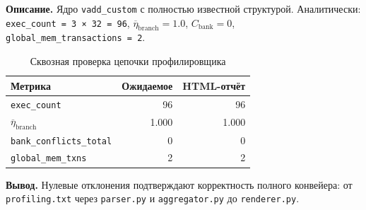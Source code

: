 \textbf{Описание.}
Ядро \texttt{vadd\_custom} с полностью известной структурой.
Аналитически: \texttt{exec\_count = 3~×~32 = 96},
$\overline{\eta}_{\mathrm{branch}} = 1.0$, $C_{\mathrm{bank}} = 0$,
\texttt{global\_mem\_transactions~= 2}.

\begin{table}[h]
  \caption{Сквозная проверка цепочки профилировщика}
  \label{tab:aggregation_test}
  \centering
  \begin{tabular}{lrr}
    \toprule
    \textbf{Метрика} & \textbf{Ожидаемое} & \textbf{HTML-отчёт} \\
    \midrule
    \texttt{exec\_count}          & 96    & 96    \\
    $\overline{\eta}_{\mathrm{branch}}$  & 1.000 & 1.000 \\
    \texttt{bank\_conflicts\_total} & 0     & 0     \\
    \texttt{global\_mem\_txns}     & 2     & 2     \\
    \bottomrule
  \end{tabular}
\end{table}

\textbf{Вывод.}
Нулевые отклонения подтверждают корректность полного конвейера:
от \texttt{profiling.txt} через \texttt{parser.py}
и \texttt{aggregator.py} до \texttt{renderer.py}.
